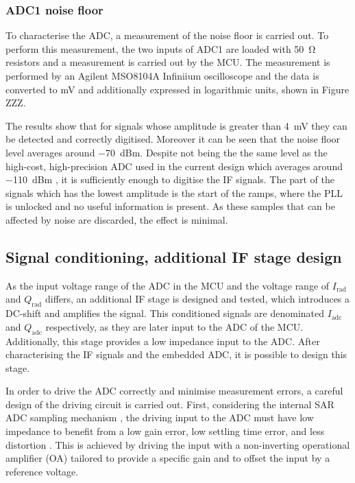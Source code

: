 \subsubsection{ADC1 noise floor}
To characterise the ADC, a measurement of the noise floor is carried out. To perform this measurement, the two inputs of ADC1 are loaded with \SI{50}{\ohm} resistors and a measurement is carried out by the MCU. The measurement is performed by an Agilent MSO8104A Infiniium oscilloscope and the data is converted to mV and additionally expressed in logarithmic units, shown in Figure ZZZ.

The results show that for signals whose amplitude is greater than \SI{4}{\milli\volt} they can be detected and correctly digitised. Moreover it can be seen that the noise floor level averages around \SI{-70}{dBm}. Despite not being the the same level as the high-cost, high-precision ADC used in the current design which averages around \SI{-110}{dBm} \cite{ADLINKTechnologies2010}, it is sufficiently enough to digitise the IF signals. The part of the signals which has the lowest amplitude is the start of the ramps, where the PLL is unlocked and no useful information is present. As these samples that can be affected by noise are discarded, the effect is minimal.

\subsection{Signal conditioning, additional IF stage design}

As the input voltage range of the ADC in the MCU and the voltage range of $I_\mathrm{rad}$ and $Q_\mathrm{rad}$ differs, an additional IF stage is designed and tested, which introduces a DC-shift and amplifies the signal. This conditioned signals are denominated $I_\mathrm{adc}$ and $Q_\mathrm{adc}$ respectively, as they are later input to the ADC of the MCU. Additionally, this stage provides a low impedance input to the ADC. After characterising the IF signals and the embedded ADC, it is possible to design this stage. 

In order to drive the ADC correctly and minimise measurement errors, a careful design of the driving circuit is carried out. First, considering the internal SAR ADC sampling mechanism \cite[pp.~356,~363]{STMicroelectronics2022a}, the driving input to the ADC must have low impedance to benefit from a low gain error, low settling time error, and less distortion \cite{Franco2014}. This is achieved by driving the input with a non-inverting operational amplifier (OA) tailored to provide a specific gain and to offset the input by a reference voltage.

